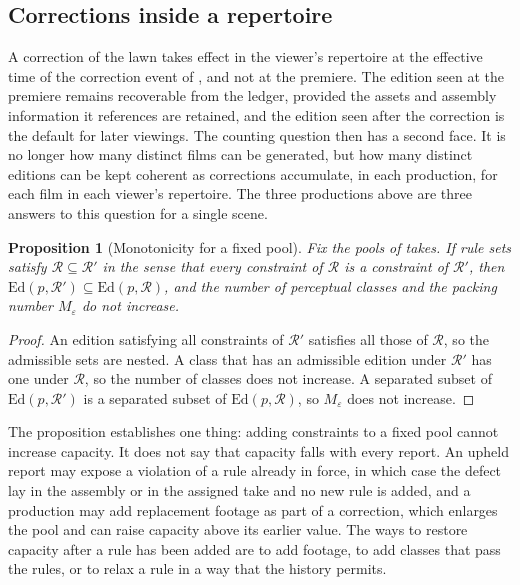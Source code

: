 \documentclass[11pt,twoside,openright]{book}
\theoremstyle{plain}
\newtheorem{proposition}[theorem]{Proposition}
\theoremstyle{definition}
\theoremstyle{remark}
\newcommand{\Ed}{\mathrm{Ed}}       %
\begin{document}
\subsection{Corrections inside a repertoire}

A correction of the lawn takes effect in the viewer's repertoire at the effective time of the correction event of , and not at the premiere. The edition seen at the premiere remains recoverable from the ledger, provided the assets and assembly information it references are retained, and the edition seen after the correction is the default for later viewings. The counting question then has a second face. It is no longer how many distinct films can be generated, but how many distinct editions can be kept coherent as corrections accumulate, in each production, for each film in each viewer's repertoire. The three productions above are three answers to this question for a single scene.

\begin{proposition}[Monotonicity for a fixed pool]\label{prop:monotone}
Fix the pools of takes. If rule sets satisfy $\mathcal R\subseteq\mathcal R'$ in the sense that every constraint of $\mathcal R$ is a constraint of $\mathcal R'$, then $\Ed(p,\mathcal R')\subseteq\Ed(p,\mathcal R)$, and the number of perceptual classes and the packing number $M_\varepsilon$ do not increase.
\end{proposition}

\begin{proof}
An edition satisfying all constraints of $\mathcal R'$ satisfies all those of $\mathcal R$, so the admissible sets are nested. A class that has an admissible edition under $\mathcal R'$ has one under $\mathcal R$, so the number of classes does not increase. A separated subset of $\Ed(p,\mathcal R')$ is a separated subset of $\Ed(p,\mathcal R)$, so $M_\varepsilon$ does not increase.
\end{proof}

The proposition establishes one thing: adding constraints to a fixed pool cannot increase capacity. It does not say that capacity falls with every report. An upheld report may expose a violation of a rule already in force, in which case the defect lay in the assembly or in the assigned take and no new rule is added, and a production may add replacement footage as part of a correction, which enlarges the pool and can raise capacity above its earlier value. The ways to restore capacity after a rule has been added are to add footage, to add classes that pass the rules, or to relax a rule in a way that the history permits.
\end{document}
